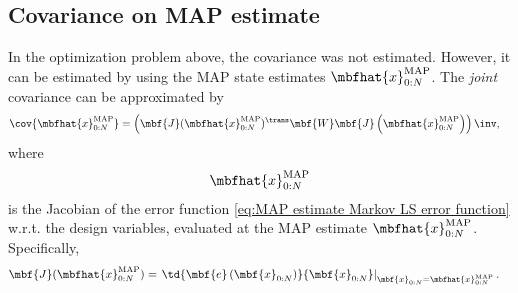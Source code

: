 \subsection{Covariance on MAP estimate}
In the optimization problem above, the covariance was not estimated. However, it can be estimated by using the MAP state estimates $\mbfhat{x}^{\mathrm{MAP}}_{0:N}$. The \emph{joint} covariance can be approximated by
\begin{align}
    \cov{\mbfhat{x}_{0:N}^{\mathrm{MAP}}} &=
    \left( \mbf{J}(\mbfhat{x}_{0:N}^{\mathrm{MAP}})^{\trans}\mbf{W}\mbf{J}\left( \mbfhat{x}_{0:N}^{\mathrm{MAP}} \right) \right)\inv,
\end{align}
where 
\begin{align}
    \mbfhat{x}_{0:N}^{\mathrm{MAP}}
\end{align}
is the Jacobian of the error function \eqref{eq:MAP estimate Markov LS error function} w.r.t. the design variables, evaluated at the MAP estimate $\mbfhat{x}_{0:N}^{\mathrm{MAP}}$. Specifically,
\begin{align}
    \mbf{J}(\mbfhat{x}_{0:N}^{\mathrm{MAP}}) &= 
    \left. \td{\mbf{e}\left( \mbf{x}_{0:N} \right)}{\mbf{x}_{0:N}}\right|_{\mbf{x}_{0:N}=\mbfhat{x}_{0:N}^{\mathrm{MAP}}}.
\end{align}

